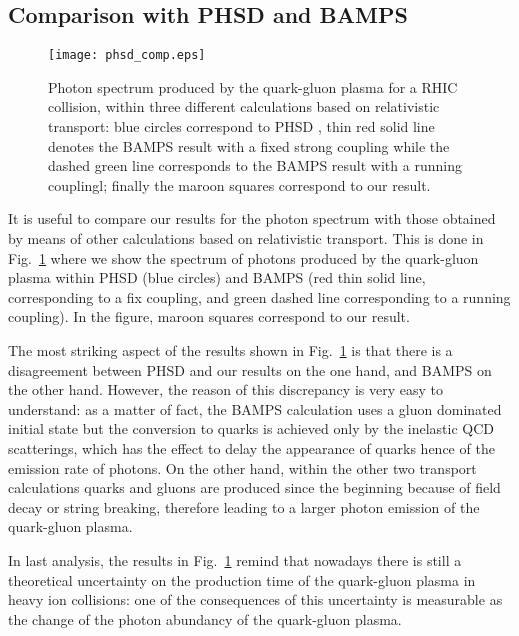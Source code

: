 \documentclass[aps,prc,a4paper,nofootinbib,
preprintnumbers,superscriptaddress,twocolumn,showpacs,showkeys]{revtex4}
\begin{document}
 
\subsection{Comparison with PHSD and BAMPS}
\begin{figure}[t!]
\begin{center}
\texttt{[image: phsd\_comp.eps]}
\end{center}
\caption{\label{Fig:phsd}Photon spectrum produced by the quark-gluon plasma
for a RHIC collision,
within three different calculations based on relativistic transport: 
blue circles correspond to PHSD \cite{Linnyk:2015tha},
thin red solid line denotes the BAMPS result \cite{Greif:2016jeb} with a fixed strong coupling
while the dashed green line corresponds to the BAMPS result with a running couplingl;
finally the maroon squares correspond to our result.}
\end{figure}

It is useful to compare our results for the photon spectrum with those obtained by means of other
calculations based on relativistic transport. This is done in Fig.~\ref{Fig:phsd} 
where we show the spectrum
of photons produced by the quark-gluon plasma within PHSD \cite{Linnyk:2015tha} (blue circles)
and BAMPS \cite{Greif:2016jeb} (red thin solid line, corresponding to a fix coupling,
and green dashed line corresponding to a running coupling). In the figure,
maroon squares correspond to our result.

The most striking aspect of the results shown in Fig.~\ref{Fig:phsd}  is that there is a disagreement
between PHSD and our results on the one hand, and BAMPS on the other hand. However, the reason of this discrepancy is very easy to understand: as a matter of fact, 
the BAMPS calculation uses a gluon dominated initial state but the conversion to quarks is
achieved only by the inelastic QCD scatterings, which has the effect to delay 
the appearance of quarks hence of the emission rate of photons. 
On the other hand, within the other two transport calculations quarks and gluons
are produced since the beginning because of field decay or string breaking, 
therefore leading to a larger photon emission of the quark-gluon plasma.

In last analysis, the results in Fig.~\ref{Fig:phsd} remind that nowadays there is still a theoretical uncertainty on the production time of the quark-gluon plasma in heavy ion collisions: one of the consequences of this uncertainty is measurable as the change of the photon abundancy of the quark-gluon plasma.
\end{document}
